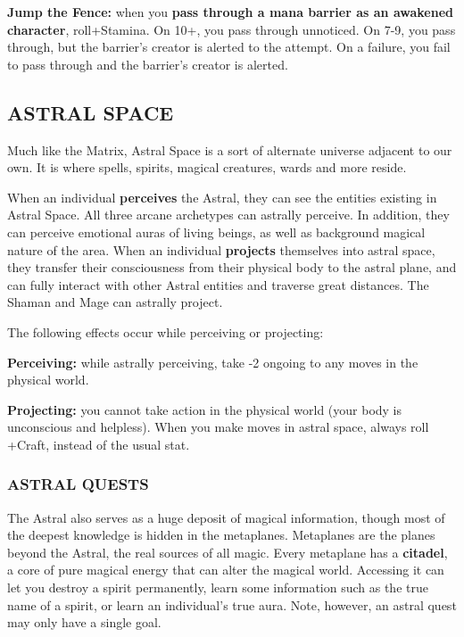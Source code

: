 \documentclass[oneside,10pt]{article}
\begin{document}
\begin{multicols}{2}
\textbf{Jump the Fence:} when you \textbf{pass through a mana barrier as an awakened character}, roll+Stamina. On 10+, you pass through unnoticed.  On 7-9, you pass through, but the barrier's creator is alerted to the attempt. On a failure, you fail to pass through and the barrier's creator is alerted.

\subsection{ASTRAL SPACE}
Much like the Matrix, Astral Space is a sort of alternate universe adjacent to our own. It is where spells, spirits, magical
creatures, wards and more reside.

When an individual \textbf{perceives} the Astral, they can see the
entities existing in Astral Space. All three arcane archetypes
can astrally perceive. In addition, they can perceive emotional
auras of living beings, as well as background magical nature
of the area. When an individual \textbf{projects} themselves into astral space, they transfer their consciousness from their physical body to the astral plane, and can fully interact with other
Astral entities and traverse great distances. The Shaman and
Mage can astrally project.

The following effects occur while perceiving or
projecting:
\begin{adjustwidth*}{.5cm}{.5cm}
\textbf{Perceiving:} while astrally perceiving, take -2 ongoing to
any moves in the physical world.

\textbf{Projecting:} you cannot take action in the physical world
(your body is unconscious and helpless). When you make
moves in astral space, always roll +Craft, instead of the
usual stat.
\end{adjustwidth*}

\subsubsection{ASTRAL QUESTS}
The Astral also serves as a huge deposit of magical information, though most of the deepest knowledge is hidden in the
metaplanes. Metaplanes are the planes beyond the Astral,
the real sources of all magic. Every metaplane has a \textbf{citadel}, a
core of pure magical energy that can alter the magical world.
Accessing it can let you destroy a spirit permanently, learn
some information such as the true name of a spirit, or learn
an individual’s true aura. Note, however, an astral quest may
only have a single goal.


\end{multicols}
\end{document}

